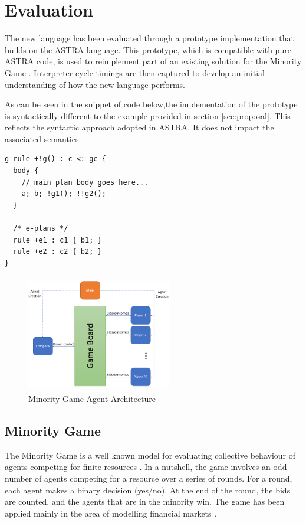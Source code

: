 \section{Evaluation}
\label{sec:evaluation}
The new language has been evaluated through a prototype implementation that builds on 
the ASTRA \cite{DBLP:conf/prima/CollierRL15} language. This prototype, which is compatible
with pure ASTRA code, is used to reimplement part of an existing solution for the Minority 
Game \cite{moro2004minority}. Interpreter cycle timings are then captured to develop an initial
understanding of how the new language performs.

As can be seen in the  snippet of code below,the implementation of the {\aser} prototype is 
syntactically different to the example provided in section \ref{sec:proposal}. This reflects 
the syntactic approach adopted in ASTRA. It does not impact the associated semantics.

{\small
\begin{verbatim}
g-rule +!g() : c <: gc { 
  body {
    // main plan body goes here...
    a; b; !g1(); !!g2();
  }

  /* e-plans */
  rule +e1 : c1 { b1; }
  rule +e2 : c2 { b2; }
}
\end{verbatim}}

\begin{figure}[!bh]
\centering
\includegraphics[height=2in, width=2.5in]{mg.png}
\caption{Minority Game Agent Architecture}
\label{fig:mgagents}
\end{figure}

\subsection{Minority Game}
\label{minority}
The Minority Game is a well known model for evaluating collective behaviour of agents competing 
for finite resources \cite{moro2004minority}. In a nutshell, the game involves an odd number of
agents competing for a resource over a series of rounds. For a round, each agent makes a binary
decision (yes/no). At the end of the round, the bids are counted, and the agents that are in the
minority win. The game has been applied mainly in the area of modelling financial markets \cite{??}.


